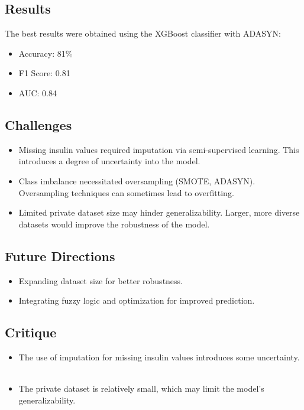 \subsection*{Results}
The best results were obtained using the XGBoost classifier with ADASYN:
\begin{itemize}
    \item Accuracy: 81\%
    \item F1 Score: 0.81
    \item AUC: 0.84
\end{itemize}

\subsection*{Challenges}
\begin{itemize}
    \item Missing insulin values required imputation via semi-supervised learning. This introduces a degree of uncertainty into the model.
    \item Class imbalance necessitated oversampling (SMOTE, ADASYN). Oversampling techniques can sometimes lead to overfitting.
    \item Limited private dataset size may hinder generalizability. Larger, more diverse datasets would improve the robustness of the model.
\end{itemize}

\subsection*{Future Directions}
\begin{itemize}
    \item Expanding dataset size for better robustness.
    \item Integrating fuzzy logic and optimization for improved prediction.
\end{itemize}
\subsection*{Critique}
\begin{itemize}
    \item The use of imputation for missing insulin values introduces some uncertainty.    
    \item The private dataset is relatively small, which may limit the model's generalizability.    
    
\end{itemize}

